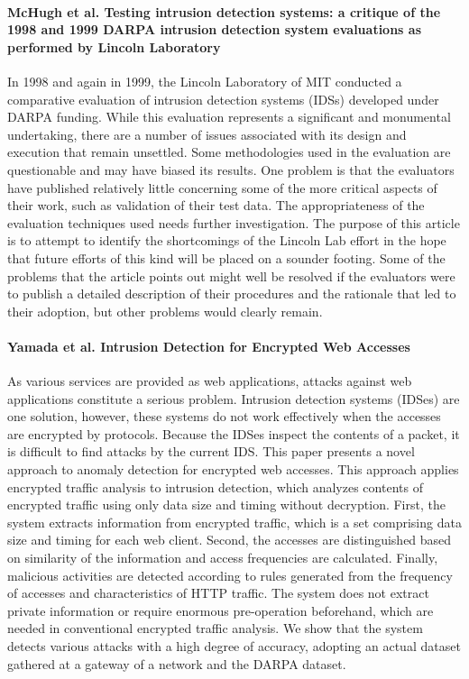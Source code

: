\paragraph*{McHugh et al. Testing intrusion detection systems: a critique of the 1998 and 1999 DARPA intrusion detection system evaluations as performed by Lincoln Laboratory}
In 1998 and again in 1999, the Lincoln Laboratory of MIT conducted a comparative evaluation of intrusion detection systems (IDSs) developed under DARPA funding. While this evaluation represents a significant and monumental undertaking, there are a number of issues associated with its design and execution that remain unsettled. Some methodologies used in the evaluation are questionable and may have biased its results. One problem is that the evaluators have published relatively little concerning some of the more critical aspects of their work, such as validation of their test data. The appropriateness of the evaluation techniques used needs further investigation. The purpose of this article is to attempt to identify the shortcomings of the Lincoln Lab effort in the hope that future efforts of this kind will be placed on a sounder footing. Some of the problems that the article points out might well be resolved if the evaluators were to publish a detailed description of their procedures and the rationale that led to their adoption, but other problems would clearly remain.
\cite{mchugh2000testing}

\paragraph*{Yamada et al. Intrusion Detection for Encrypted Web Accesses } 
\cite{yamada2007intrusion}
As various services are provided as web applications, attacks against web applications constitute a serious problem. Intrusion detection systems (IDSes) are one solution, however, these systems do not work effectively when the accesses are encrypted by protocols. Because the IDSes inspect the contents of a packet, it is difficult to find attacks by the current IDS. This paper presents a novel approach to anomaly detection for encrypted web accesses. This approach applies encrypted traffic analysis to intrusion detection, which analyzes contents of encrypted traffic using only data size and timing without decryption. First, the system extracts information from encrypted traffic, which is a set comprising data size and timing for each web client. Second, the accesses are distinguished based on similarity of the information and access frequencies are calculated. Finally, malicious activities are detected according to rules generated from the frequency of accesses and characteristics of HTTP traffic. The system does not extract private information or require enormous pre-operation beforehand, which are needed in conventional encrypted traffic analysis. We show that the system detects various attacks with a high degree of accuracy, adopting an actual dataset gathered at a gateway of a network and the DARPA dataset.

